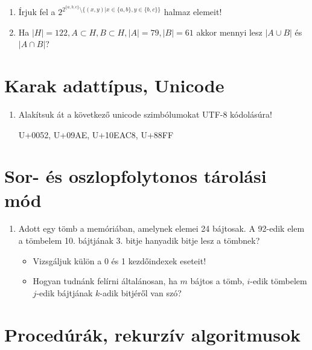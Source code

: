 \documentclass[a4paper]{article}
\begin{document}
\begin{enumerate}
\item

Írjuk fel a $2^{2^{\{a, b, c\}} \setminus \{(x, y)|x \in\{a, b\},  y \in\{b, c\}\}}$ halmaz elemeit!

\item

Ha $|H| = 122, A \subset H, B \subset H, |A| = 79, |B| = 61$ akkor mennyi lesz $|A \cup B|$ és $|A \cap B|$?

\end{enumerate}

\section*{Karak adattípus, Unicode}

\begin{enumerate}

\item

Alakítsuk át a következő unicode szimbólumokat UTF-8 kódolásúra!

U+0052, \quad U+09AE, \quad U+10EAC8, \quad U+88FF

\end{enumerate}

\section*{Sor- és oszlopfolytonos tárolási mód}

\begin{enumerate}

\medskip

\item

Adott egy tömb a memóriában, amelynek elemei 24 bájtosak. A 92-edik elem a tömbelem 10. bájtjának 3. bitje hanyadik bitje lesz a tömbnek?
\begin{itemize}
	\item Vizsgáljuk külön a 0 és 1 kezdőindexek eseteit!
	\item Hogyan tudnánk felírni általánosan, ha $m$ bájtos a tömb, $i$-edik tömbelem $j$-edik bájtjának $k$-adik bitjéről van szó?
\end{itemize}

\end{enumerate}

\section*{Procedúrák, rekurzív algoritmusok}
\end{document}
